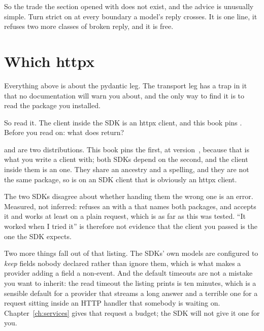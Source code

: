So the trade the section opened with does not exist, and the advice is
unusually simple. Turn strict on at every boundary a model's reply crosses.
It is one line, it refuses two more classes of broken reply, and it is free.

\section{Which httpx}
\label{sec:ai-which-httpx}

Everything above is about the pydantic leg. The transport leg has a trap in
it that no documentation will warn you about, and the only way to find it
is to read the package you installed.

So read it. The client inside the SDK is an httpx client, and this book pins
. Before you read on: what does
 return?



 and  are two distributions. This book pins the
first, at version~\httpxver, because that is what you write a client with;
both SDKs depend on the second, and the client inside them is an
 one. They share an ancestry and a spelling, and they are not
the same package, so  is
 on an SDK client that is obviously an httpx client.

\begin{warning}
The two SDKs disagree about whether handing them the wrong one is an error.
Measured, not inferred:  refuses an  with a
 that names both packages, and  accepts it and
works \dash{} at least on a plain request, which is as far as this was
tested. \enquote{It worked when I tried it} is therefore not evidence that
the client you passed is the one the SDK expects.
\end{warning}

Two more things fall out of that listing. The SDKs' own models are
configured to \emph{keep} fields nobody declared rather than ignore them,
which is what makes a provider adding a field a non-event. And the default
timeouts are not a mistake you want to inherit: the read timeout the listing
prints is ten minutes, which is a sensible default for a provider that streams a long
answer and a terrible one for a request sitting inside an HTTP handler that
somebody is waiting on. Chapter~\ref{ch:services} gives that request a
budget; the SDK will not give it one for you.

